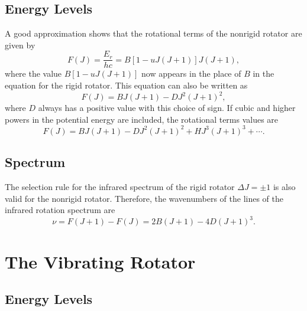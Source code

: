 \documentclass[11pt, twoside, fleqn]{report}
\DeclareRobustCommand\_{\ifmmode\expandafter\subtxt\else\textunderscore\fi}
\begin{document}
\section{Energy Levels}
\label{s:energy_levels_4}

A good approximation shows that the rotational terms of the nonrigid rotator are given by
\begin{equation*}
    F(J) = \frac{E_r}{hc} = B[1 - uJ(J + 1)]J(J + 1),
\end{equation*}
where the value $B[1 - uJ(J + 1)]$ now appears in the place of $B$ in the equation for the rigid rotator. This equation can also be written as
\begin{equation*}
    F(J) = BJ(J + 1) - DJ^2(J + 1)^2,
\end{equation*}
where $D$ always has a positive value with this choice of sign. If cubic and higher powers in the potential energy are included, the rotational terms values are
\begin{equation*}
    F(J) = BJ(J + 1) - DJ^2(J + 1)^2 + HJ^3(J + 1)^3 + \dotsb.
\end{equation*}

\section{Spectrum}
\label{s:spectrum_3}

The selection rule for the infrared spectrum of the rigid rotator $\Delta{}J = \pm 1$ is also valid for the nonrigid rotator. Therefore, the wavenumbers of the lines of the infrared rotation spectrum are
\begin{equation*}
    \nu = F(J + 1) - F(J) = 2B(J + 1) - 4D(J + 1)^3.
\end{equation*}

\chapter{The Vibrating Rotator}
\label{c:the_vibrating_rotator}

\section{Energy Levels}
\label{s:energy_levels_5}
\end{document}

